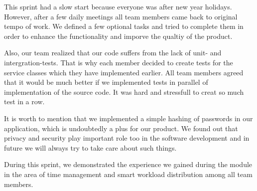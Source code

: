 This sprint had a slow start because everyone was after new year holidays. However, after a few daily meetings all team members came back to original tempo of work. We defined a few optional tasks and tried to complete them in order to enhance the functionality and imporve the qualtiy of the product.

Also, our team realized that our code suffers from the lack of unit- and intergration-tests. That is why each member decided to create tests for the service classes which they have implemented earlier. 
All team members agreed that it would be much better if we implemented tests in parallel of implementation of the source code. It was hard and stressfull to creat so much test in a row.

It is worth to mention that we implemented a simple hashing of passwords in our application, which is undoubtedly a plus for our product. We found out that privacy and security play important role too in the software development and in future we will always try to take care about such things.

During this sprint, we demonstrated the experience we gained during the module in the area of time management and smart workload distribution among all team members.
